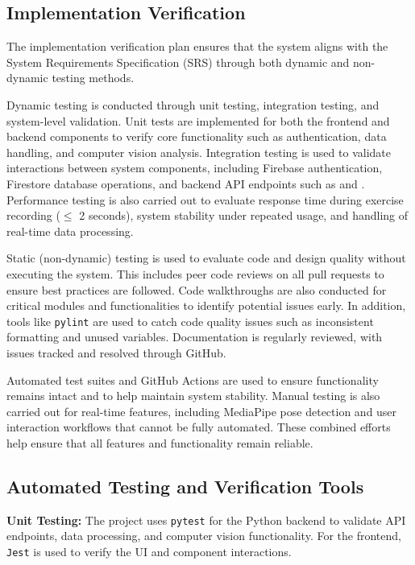 \documentclass[12pt, titlepage]{article}
\begin{document}
\subsection{Implementation Verification}

The implementation verification plan ensures that the system aligns with the System Requirements Specification (SRS) through both dynamic and non-dynamic testing methods.

Dynamic testing is conducted through unit testing, integration testing, and system-level validation. Unit tests are implemented for both the frontend and backend components to verify core functionality such as authentication, data handling, and computer vision analysis. Integration testing is used to validate interactions between system components, including Firebase authentication, Firestore database operations, and backend API endpoints such as  and . Performance testing is also carried out to evaluate response time during exercise recording ($\leq$ 2 seconds), system stability under repeated usage, and handling of real-time data processing.

Static (non-dynamic) testing is used to evaluate code and design quality without executing the system. This includes peer code reviews on all pull requests to ensure best practices are followed. Code walkthroughs are also conducted for critical modules and functionalities to identify potential issues early. In addition, tools like \texttt{pylint} are used to catch code quality issues such as inconsistent formatting and unused variables. Documentation is regularly reviewed, with issues tracked and resolved through GitHub.

Automated test suites and GitHub Actions are used to ensure functionality remains intact and to help maintain system stability. Manual testing is also carried out for real-time features, including MediaPipe pose detection and user interaction workflows that cannot be fully automated. These combined efforts help ensure that all features and functionality remain reliable.
\subsection{Automated Testing and Verification Tools}

\textbf{Unit Testing:}
The project uses \texttt{pytest} for the Python backend to validate API endpoints, data processing, and computer vision functionality. For the frontend, \texttt{Jest} is used to verify the UI and component interactions. 
\end{document}
